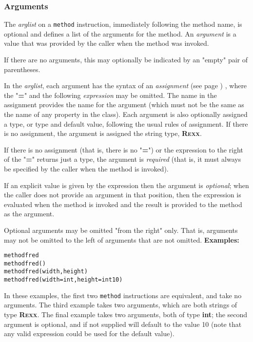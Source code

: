 \subsubsection{Arguments}
 
The \emph{arglist} on a \texttt{method} instruction, immediately
following the method name, is optional and defines a list of the
arguments for the method.  An \emph{argument} is a value that was
provided by the caller when the method was invoked.
 
If there are no arguments, this may optionally be indicated by an
"empty" pair of parentheses.
 
In the \emph{arglist}, each argument has the syntax of an
 \emph{assignment} (see page \pageref{refassign}) , where the "\textbf{=}"
and the following \emph{expression} may be omitted.
The name in the assignment provides the name for the argument (which
must not be the same as the name of any property in the class).
Each argument is also optionally assigned a type, or type and default
value, following the usual rules of assignment.
If there is no assignment, the argument is assigned the \nr{} string
type, \textbf{R\textsc{exx}}.
 
If there is no assignment (that is, there is no "\textbf{=}") or
the expression to the right of the "\textbf{=}" returns just a
type, the argument is \emph{required} (that is, it must always be
specified by the caller when the method is invoked).
 
If an explicit value is given by the expression then the argument is
\emph{optional}; when the caller does not provide an argument in that
position, then the expression is evaluated when the method is invoked
and the result is provided to the method as the argument.
 
Optional arguments may be omitted "from the right" only.
That is, arguments may not be omitted to the left of arguments that are
not omitted.
 \textbf{Examples:}
\begin{alltt}
method fred
method fred()
method fred(width, height)
method fred(width=int, height=int 10)
\end{alltt}
In these examples, the first two \texttt{method} instructions are
equivalent, and take no arguments.
The third example takes two arguments, which are both strings
of type \textbf{R\textsc{exx}}.
The final example takes two arguments, both of type \textbf{int}; the
second argument is optional, and if not supplied will default to the
value 10 (note that any valid expression could be used for the default
value).
